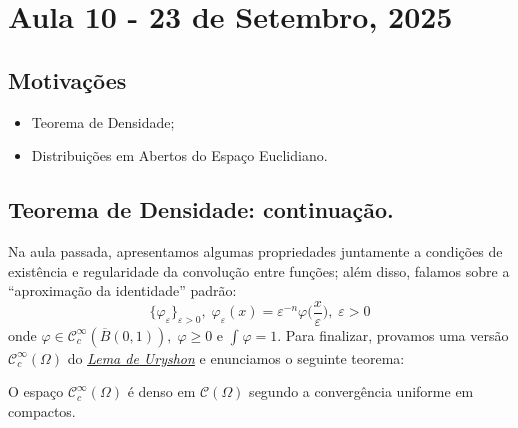 \documentclass[../distribution_theory_notes.tex]{subfiles}
\begin{document}
\section{Aula 10 - 23 de Setembro, 2025}
\subsection{Motivações}
\begin{itemize}
 \item Teorema de Densidade;
 \item Distribuições em Abertos do Espaço Euclidiano.
\end{itemize}
\subsection{Teorema de Densidade: continuação.}
  Na aula passada, apresentamos algumas propriedades juntamente a condições de existência e regularidade da convolução entre funções; além disso, falamos sobre a ``aproximação da identidade'' padrão:  
    \[
      \{\varphi_{\varepsilon }\}_{\varepsilon >0},\; \varphi_{\varepsilon }(x)=\varepsilon^{-n}\varphi \biggl(\frac{x}{\varepsilon }\biggr),\; \varepsilon >0
    \]
    onde \(\varphi \in \mathcal{C}_{c}^{\infty}(\overline{B}(0, 1)),\; \varphi \geq 0\) e \(\int_{}^{}\varphi = 1. \) Para finalizar, provamos uma versão \(\mathcal{C}_{c}^{\infty}(\Omega )\) do \hyperlink{uryhson_lemma}{\textit{Lema de Uryshon}} e enunciamos o seguinte teorema:
\begin{theorem*}
	O espaço \(\mathcal{C}_{c}^{\infty}(\Omega )\) é denso em \(\mathcal{C}(\Omega )\) segundo a convergência uniforme em compactos.
\end{theorem*}
\end{document}
